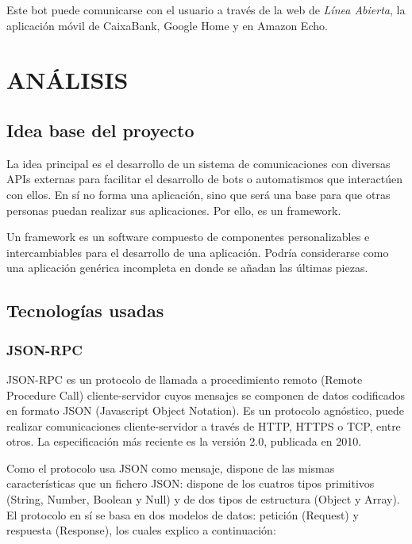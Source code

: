 \documentclass[spanish,12pt, a4paper, twoside]{paper}
\let\oldsection\section
\def\section{\cleardoublepage\oldsection}
\begin{document}
Este bot puede comunicarse con el usuario a través de la web de \emph{Línea Abierta}, la aplicación móvil de CaixaBank, Google Home y en Amazon Echo.

\section{ANÁLISIS}

\subsection{Idea base del proyecto}

La idea principal es el desarrollo de un sistema de comunicaciones con diversas APIs externas para facilitar el desarrollo de bots o automatismos que interactúen con ellos. En sí no forma una aplicación, sino que será una base para que otras personas puedan realizar sus aplicaciones. Por ello, es un framework.
\newline

Un framework es un software compuesto de componentes personalizables e intercambiables para el desarrollo de una aplicación. Podría considerarse como una aplicación genérica incompleta en donde se añadan las últimas piezas. \cite[pág. 1]{FrameworkJJG}

\subsection{Tecnologías usadas}

\subsubsection{JSON-RPC}

JSON-RPC es un protocolo de llamada a procedimiento remoto (Remote Procedure Call) cliente-servidor cuyos mensajes se componen de datos codificados en formato JSON (Javascript Object Notation). Es un protocolo agnóstico, puede realizar comunicaciones cliente-servidor a través de HTTP, HTTPS o TCP, entre otros. La especificación más reciente es la versión 2.0, publicada en 2010.
\newline

Como el protocolo usa JSON como mensaje, dispone de las mismas características que un fichero JSON: dispone de los cuatros tipos primitivos (String, Number, Boolean y Null) y de dos tipos de estructura (Object y Array).
El protocolo en sí se basa en dos modelos de datos: petición (Request) y respuesta (Response), los cuales explico a continuación:
\end{document}
